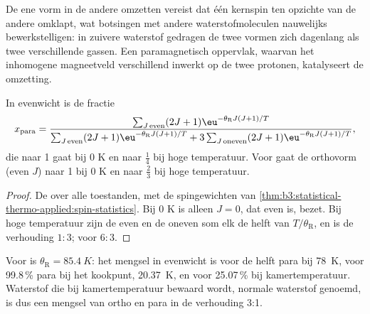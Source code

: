 De ene vorm in de andere omzetten vereist dat één kernspin ten opzichte
van de andere omklapt, wat botsingen met andere waterstofmoleculen
nauwelijks bewerkstelligen: in zuivere waterstof gedragen de twee vormen
zich dagenlang als twee verschillende gassen. Een paramagnetisch
oppervlak, waarvan het inhomogene magneetveld verschillend inwerkt op de
twee protonen, katalyseert de omzetting.

\begin{proposition}\label{prop:b3:statistical-thermo-applied:ortho-para}
In evenwicht is de fractie 
\[
  x_{\mathrm{para}} = \frac{\sum_{J\,\mathrm{even}}(2J+1)\eu^{-\theta_{\mathrm R}J(J+1)/T}}
    {\sum_{J\,\mathrm{even}}(2J+1)\eu^{-\theta_{\mathrm R}J(J+1)/T} + 3\sum_{J\,\mathrm{oneven}}(2J+1)\eu^{-\theta_{\mathrm R}J(J+1)/T}},
\]
die naar 1 gaat bij 0 K en naar $\frac14$ bij hoge temperatuur. Voor
 gaat de orthovorm
(even $J$) naar 1 bij 0 K en naar $\frac23$ bij hoge temperatuur.
\end{proposition}

\begin{proof}
De  over alle toestanden, met de spingewichten van
\cref{thm:b3:statistical-thermo-applied:spin-statistics}. Bij 0 K is
alleen $J = 0$, dat even is, bezet. Bij hoge temperatuur zijn de even en
de oneven som elk de helft van $T/\theta_{\mathrm R}$, en is de verhouding
$1 : 3$; voor  $6 : 3$.
\end{proof}

Voor  is $\theta_{\mathrm R} = \qty{85.4}{K}$: het mengsel in evenwicht is voor de helft para bij \qty{78}{K},
voor 99.8\,\% para bij het kookpunt, \qty{20.37}{K}, en voor 25.07\,\% bij
kamertemperatuur. Waterstof die bij kamertemperatuur bewaard wordt,
normale waterstof genoemd, is dus een mengsel van ortho en para in de
verhouding 3:1.

